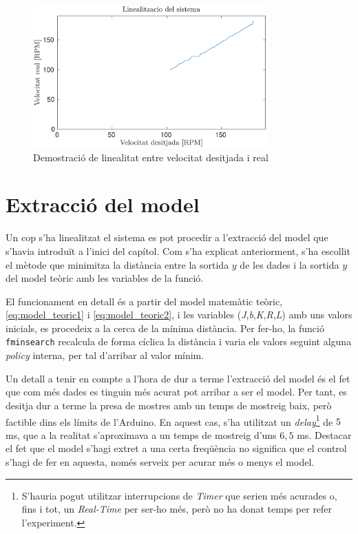 \documentclass[12pt,a4paper,final,twoside,openright]{report}
\begin{document}
\begin{figure}[ht]
\centering
\includegraphics[width=0.8\textwidth]{linealitat.eps}
\caption{Demostració de linealitat entre velocitat desitjada i real\label{fig:linealitat}}
\end{figure}

\section{Extracció del model}
Un cop s'ha linealitzat el sistema es pot procedir a l'extracció del model que s'havia introduït a l'inici del capítol. Com s'ha explicat anteriorment, s'ha escollit el mètode que minimitza la distància entre la sortida $y$ de les dades i la sortida $y$ del model teòric amb les variables de la funció.

El funcionament en detall és a partir del model matemàtic teòric, \eqref{eq:model_teoric1} i \eqref{eq:model_teoric2}, i les variables (\textit{J},\textit{b},\textit{K},\textit{R},\textit{L}) amb uns valors inicials, es procedeix a la cerca de la mínima distància. Per fer-ho, la funció \texttt{fminsearch} recalcula de forma cíclica la distància i varia els valors seguint alguna \textit{policy} interna, per tal d'arribar al valor mínim.

Un detall a tenir en compte a l'hora de dur a terme l'extracció del model és el fet que com més dades es tinguin més acurat pot arribar a ser el model. Per tant, es desitja dur a terme la presa de mostres amb un temps de mostreig baix, però factible dins els límits de l'Arduino. En aquest cas, s'ha utilitzat un \textit{delay}\footnote{S'hauria pogut utilitzar interrupcions de \textit{Timer} que serien més acurades o, fins i tot, un \textit{Real-Time} per ser-ho més, però no ha donat temps per refer l'experiment.} de $5$ ms, que a la realitat s'aproximava a un temps de mostreig d'uns $6,5$ ms. Destacar el fet que el model s'hagi extret a una certa freqüència no significa que el control s'hagi de fer en aquesta, només serveix per acurar més o menys el model.
\end{document}
